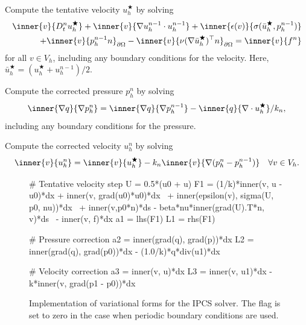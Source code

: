 {
\item
  Compute the tentative velocity $u_h^\bigstar$ by solving
  \begin{equation}\label{eq:ipcs,1}
    \begin{split}
      \inner{v}{D_t^n u_h^{\bigstar}}
      + \inner{v}{\nabla u_h^{n-1} \cdot u_h^{n-1}}
      + \inner{\epsilon(v)}{\sigma(\bar{u}_h^{\bigstar}, p^{n-1}_h)} \\
      + \inner{v}{p^{n-1}_h n}_{\partial\Omega}
      - \inner{v}{\nu (\nabla \bar{u}_h^{\bigstar})^{\top} n}_{\partial\Omega}
      = \inner{v}{f^n}
    \end{split}
  \end{equation}
  for all $v \in V_h$, including any boundary conditions for the
  velocity. Here, $\bar{u}_h^{\bigstar} = (u_h^{\bigstar} + u_h^{n-1}) / 2$.

\item
  Compute the corrected pressure $p_h^n$ by solving
  \begin{equation}\label{eq:ipcs,2}
    \inner{\nabla q}{\nabla p^n_h}
    = \inner{\nabla q}{\nabla p^{n-1}_h} - \inner{q}{\nabla \cdot u_h^{\bigstar}} / k_n,
  \end{equation}
  including any boundary conditions for the pressure.

\item
  Compute the corrected velocity $u_h^n$ by solving
  \begin{equation}\label{eq:ipcs,3}
    \inner{v}{u_h^n} = \inner{v}{u_h^{\bigstar}} - k_n\inner{v}{\nabla(p_h^n-p_h^{n-1})}
    \quad \forall v \in V_h.
  \end{equation}
  \label{ipcs_listing}
}

\begin{figure}[hbp]
  \codesize
  \begin{center}
    \begin{python}
# Tentative velocity step
U = 0.5*(u0 + u)
F1 = (1/k)*inner(v, u - u0)*dx + inner(v, grad(u0)*u0)*dx \
   + inner(epsilon(v), sigma(U, p0, nu))*dx \
   + inner(v,p0*n)*ds - beta*nu*inner(grad(U).T*n, v)*ds \
   - inner(v, f)*dx
a1 = lhs(F1)
L1 = rhs(F1)

# Pressure correction
a2 = inner(grad(q), grad(p))*dx
L2 = inner(grad(q), grad(p0))*dx - (1.0/k)*q*div(u1)*dx

# Velocity correction
a3 = inner(v, u)*dx
L3 = inner(v, u1)*dx - k*inner(v, grad(p1 - p0))*dx
    \end{python}
    \caption{Implementation of variational forms for the IPCS
      solver. The flag \emp{beta = 1} is set to zero in the case when
      periodic boundary conditions are used.}
    \label{fig:IPCS}
  \end{center}
\end{figure}

